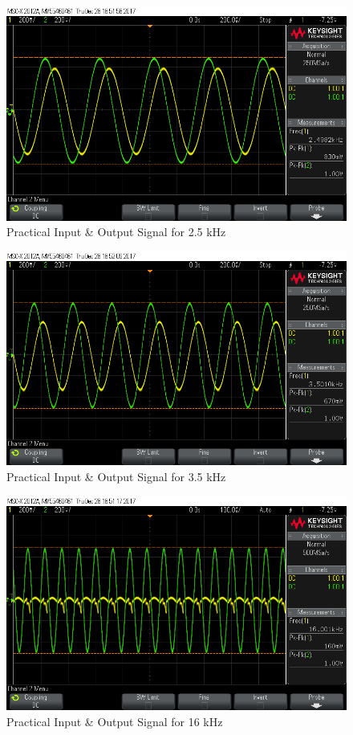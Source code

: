 \documentclass[paper]{IEEEtran}
\begin{document}
	

\begin{figure}[H]
	\setlength{\unitlength}{\textwidth}
	\center 
	\includegraphics[width=0.45\unitlength]{lpf_osc4.png}
	\caption{\label{fig:lpfosc4}Practical Input \& Output Signal for 2.5 kHz}
\end{figure} 
	

\begin{figure}[H]
	\setlength{\unitlength}{\textwidth}
	\center 
	\includegraphics[width=0.45\unitlength]{lpf_osc5.png}
	\caption{\label{fig:lpfosc5}Practical Input \& Output Signal for 3.5 kHz}
\end{figure} 
		

\begin{figure}[H]
	\setlength{\unitlength}{\textwidth}
	\center 
	\includegraphics[width=0.45\unitlength]{lpf_osc2.png}
	\caption{\label{fig:lpfosc2}Practical Input \& Output Signal for 16 kHz}
\end{figure} 
\end{document}
